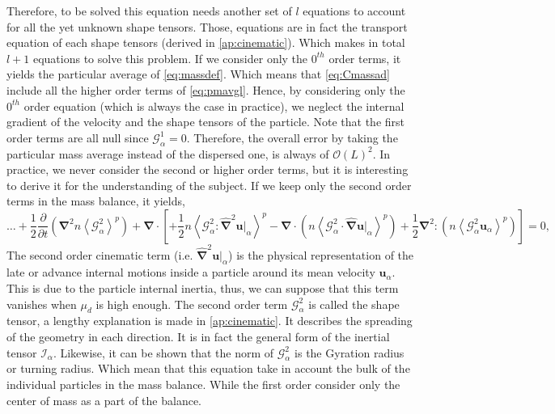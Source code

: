 Therefore, to be solved this equation needs another set of $l$ equations to account for all the yet unknown shape tensors. 
Those, equations are in fact the transport equation of each shape tensors (derived in \ref{ap:cinematic}). 
Which makes in total $l+1$ equations to solve this problem. 
If we consider only the $0^{th}$ order terms, it yields the particular average of \ref{eq:massdef}.
Which means that \ref{eq:Cmassad} include all the higher order terms of \ref{eq:pmavgl}. 
Hence, by considering only the $0^{th}$ order equation (which is always the case in practice), we neglect the internal gradient of the velocity and the shape tensors of the particle. 
Note that the first order terms are all null since $\mathcal{G}^1_\alpha = 0$.
Therefore, the overall error by taking the particular mass average instead of the dispersed one, is always of $\mathcal{O}\left(L\right)^2$.
In practice, we never consider the second or higher order terms, but it is interesting to derive it for the understanding of the subject.
If we keep only the second order terms in the mass balance, it yields,
\begin{equation}
    \ldots +
    \frac{1}{2}
    \frac{\partial }{\partial t}\left(
          \bm{\nabla}^2  n \left<\mathcal{G}_\alpha^2\right>^p
    \right) 
    + \bm{\nabla}\cdot\left[
        + \frac{1}{2}  n \left<\mathcal{G}_\alpha^2 : \hat{\bm{\nabla}}^{2} \bm{u}|_\alpha \right>^p
        - \bm{\nabla} \cdot \left(n \left<\mathcal{G}_\alpha^2 \cdot \hat{\bm{\nabla}} \bm{u}|_\alpha \right>^p\right)
        + \frac{1}{2} \bm{\nabla}^{2} : \left(n \left<\mathcal{G}_\alpha^2 \bm{u}_\alpha  \right>^p\right)
    \right]
    =0,
\end{equation}
The second order cinematic term (i.e. $\hat{\bm{\nabla}}^{2} \bm{u}|_\alpha$) is the physical representation of the late or advance internal motions inside a particle around its mean velocity $\bm{u}_\alpha$.  
This is due to the particle internal inertia, thus, we can suppose that this term vanishes when $\mu_d$ is high enough.
The second order term $\mathcal{G}_\alpha^2$ is called the shape tensor, a lengthy explanation is made in \ref{ap:cinematic}. 
It describes the spreading of the geometry in each direction. 
It is in fact the general form of the inertial tensor $\mathcal{I}_\alpha$.
Likewise, it can be shown that the norm of $\mathcal{G}_\alpha^2$ is the Gyration radius or turning radius. 
Which mean that this equation take in account the bulk of the individual particles in the mass balance.
While the first order consider only the center of mass as a part of the balance. 
